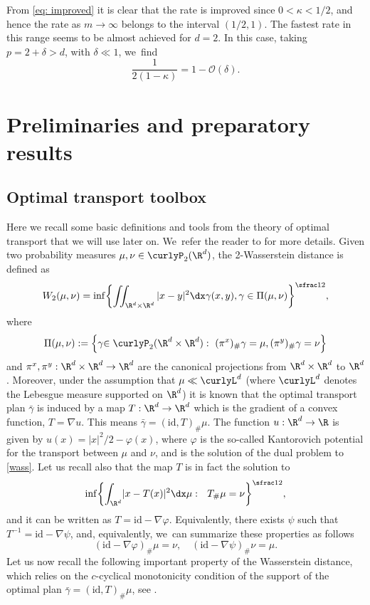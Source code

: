 From \eqref{eq: improved} it is clear that the rate is improved since $0<{\kappa}<1/2$, and hence the rate as $m\to\infty$ belongs to the interval $(1/2, 1)$.
The fastest rate in this range seems to be almost achieved for $d=2$. In this case,
taking $p=2+\delta>d$, with $\delta\ll1$, we~find
\begin{equation*}
\frac{1}{2(1-\kappa)}= 1 - \mathcal{O}(\delta).
\end{equation*}

\section{Preliminaries and preparatory results}\label{sec: prelim}

\subsection{Optimal transport toolbox}

Here we recall some basic definitions and tools from the theory of optimal transport that we will use later on. We~refer the reader to \cite{OTAM,villaniOT} for more details.
Given two probability measures $\mu, \nu \in \curlyP_2(\R^d)$, the 2-Wasserstein distance is defined as
\begin{equation}\label{wass}
W_2(\mu, \nu) = \inf \biggl\{\iint_{\R^d\times\R^d} |x-y|^2 \dx \gamma(x,y), \gamma \in \Pi(\mu,\nu)\biggr\}^{\sfrac 12},
\end{equation}
where
\[
\Pi(\mu,\nu):=\left\{\gamma {\in\curlyP_2(\R^d\times\R^d)}:\ (\pi^x)_\#\gamma = \mu, (\pi^y)_\#\gamma = \nu \right\}
\]
and ${\pi^x, \pi^y:\R^d\times\R^d\to\R^d}$ are the canonical projections from $\R^d\times\R^d$ to $\R^d$. Moreover, under the assumption that $\mu\ll \curlyL^d$ (where $\curlyL^d$ denotes the Lebesgue measure {supported} on $\R^d$) it is known that the optimal transport plan $\bar\gamma$ is induced by a map $T:\R^d\to\R^d$ which is the gradient of a convex function, $T=\nabla u$. This means $\bar\gamma= (\mathrm{id}, T)_\#\mu$. The function $u:\R^d \to \R$ is given by $u(x)=|x|^2/2 -\varphi(x)$, where $\varphi$ is the so-called Kantorovich potential for the transport between $\mu$ and $\nu$, and is the solution of the dual problem to \eqref{wass}.
Let us recall also that the map $T$ is in fact the solution to
\begin{equation*}
\inf \biggl\{{\int_{\R^d}} |x-T(x)|^2 \dx \mu:\ \ T_\#\mu = \nu\biggr\}^{\sfrac 12},
\end{equation*}
and it can be written as $T=\mathrm{id} - \nabla \varphi$.
Equivalently, there exists $\psi$ such that $T^{-1}=\mathrm{id}-\nabla \psi$, and, equivalently, we~can summarize these properties as follows
\begin{equation*}
(\mathrm{id} - \nabla \varphi)_\#\mu = \nu, \quad (\mathrm{id} - \nabla \psi)_\#\nu = \mu.
\end{equation*}
Let us now recall the following important property of the Wasserstein distance, which relies on the $c$-cyclical monotonicity condition {of the support of the optimal plan $\bar\gamma = (\mathrm{id}, T)_\#\mu$}, see \cite{BJR2007}.

